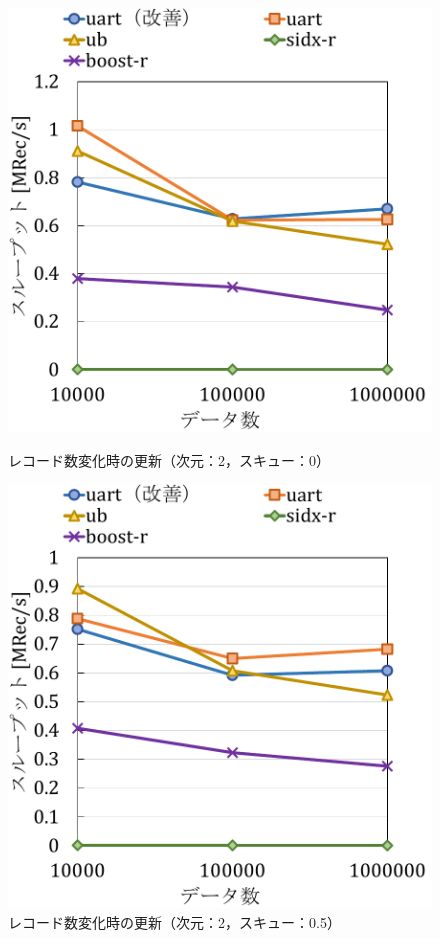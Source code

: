 \begin{figure}[tb]
  \begin{minipage}[c]{0.495\textwidth}
    \centering
    \includegraphics[scale=0.5]{./figures/graph-record-update-2-0.pdf}
    \caption{レコード数変化時の更新（次元：2，スキュー：0）}
    \label{graph:rec-upd-2-0}
  \end{minipage}
  \begin{minipage}[c]{0.495\textwidth}
    \centering
    \includegraphics[scale=0.5]{./figures/graph-record-update-2-0.5.pdf}
    \caption{レコード数変化時の更新（次元：2，スキュー：0.5）}
    \label{graph:rec-upd-2-0.5}
  \end{minipage}
\end{figure}
